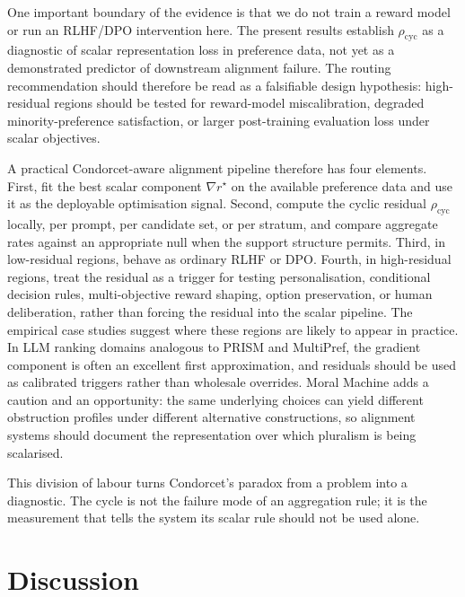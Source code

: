 \documentclass[10pt]{article}
\theoremstyle{definition}
\theoremstyle{remark}
\begin{document}
One important boundary of the evidence is that we do not train a reward model or run an RLHF/DPO intervention here. The present results establish $\rho_{\mathrm{cyc}}$ as a diagnostic of scalar representation loss in preference data, not yet as a demonstrated predictor of downstream alignment failure. The routing recommendation should therefore be read as a falsifiable design hypothesis: high-residual regions should be tested for reward-model miscalibration, degraded minority-preference satisfaction, or larger post-training evaluation loss under scalar objectives.

A practical Condorcet-aware alignment pipeline therefore has four elements. First, fit the best scalar component $\nabla r^\star$ on the available preference data and use it as the deployable optimisation signal. Second, compute the cyclic residual $\rho_{\mathrm{cyc}}$ locally, per prompt, per candidate set, or per stratum, and compare aggregate rates against an appropriate null when the support structure permits. Third, in low-residual regions, behave as ordinary RLHF or DPO. Fourth, in high-residual regions, treat the residual as a trigger for testing personalisation, conditional decision rules, multi-objective reward shaping, option preservation, or human deliberation, rather than forcing the residual into the scalar pipeline. The empirical case studies suggest where these regions are likely to appear in practice. In LLM ranking domains analogous to PRISM and MultiPref, the gradient component is often an excellent first approximation, and residuals should be used as calibrated triggers rather than wholesale overrides. Moral Machine adds a caution and an opportunity: the same underlying choices can yield different obstruction profiles under different alternative constructions, so alignment systems should document the representation over which pluralism is being scalarised.

This division of labour turns Condorcet's paradox from a problem into a diagnostic. The cycle is not the failure mode of an aggregation rule; it is the measurement that tells the system its scalar rule should not be used alone.

\section{Discussion}
\end{document}
